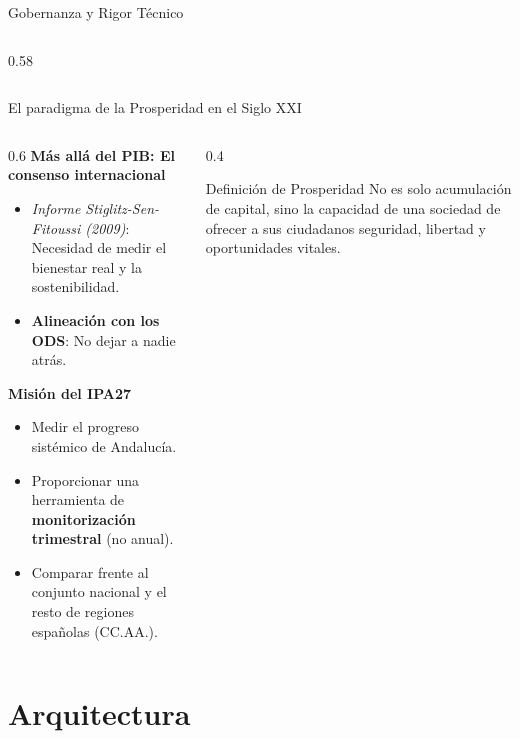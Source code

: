 \documentclass[10pt, aspectratio=169]{beamer}
\begin{document}
\begin{frame}{Gobernanza y Rigor Técnico}
\begin{columns}[T]
\begin{column}{0.58\textwidth}
            \vspace{0.4cm}
        \end{column}
    \end{columns}
\end{frame}

\begin{frame}{El paradigma de la Prosperidad en el Siglo XXI}
    \begin{columns}
        \begin{column}{0.6\textwidth}
            \textbf{Más allá del PIB: El consenso internacional}
            \begin{itemize}
                \item \textit{Informe Stiglitz-Sen-Fitoussi (2009)}: Necesidad de medir el bienestar real y la sostenibilidad.
                \item \textbf{Alineación con los ODS}: No dejar a nadie atrás.
            \end{itemize}
            \vspace{0.4cm}
            \textbf{Misión del IPA27}
            \begin{itemize}
                \item Medir el progreso sistémico de Andalucía.
                \item Proporcionar una herramienta de \textbf{monitorización trimestral} (no anual).
                \item Comparar frente al conjunto nacional y el resto de regiones españolas (CC.AA.).
            \end{itemize}
        \end{column}
        \begin{column}{0.4\textwidth}
            \begin{block}{Definición de Prosperidad}
                No es solo acumulación de capital, sino la capacidad de una sociedad de ofrecer a sus ciudadanos seguridad, libertad y oportunidades vitales.
            \end{block}
        \end{column}
    \end{columns}
\end{frame}

\section{Arquitectura}
\end{document}
